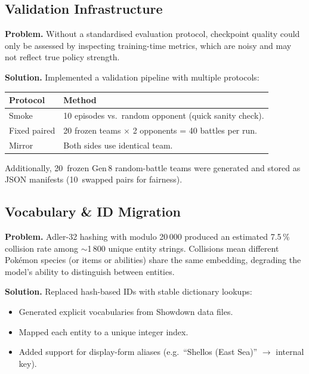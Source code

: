\subsection{Validation Infrastructure}

\textbf{Problem.} Without a standardised evaluation protocol, checkpoint
quality could only be assessed by inspecting training-time metrics, which are
noisy and may not reflect true policy strength.

\textbf{Solution.} Implemented a validation pipeline with multiple protocols:

\begin{center}
\small
\begin{tabularx}{\textwidth}{l X}
  \toprule
  \textbf{Protocol} & \textbf{Method} \\
  \midrule
  Smoke        & 10 episodes vs.\ random opponent (quick sanity check). \\
  Fixed paired & 20 frozen teams $\times$ 2 opponents = 40 battles per run. \\
  Mirror       & Both sides use identical team. \\
  \bottomrule
\end{tabularx}
\end{center}

Additionally, 20~frozen Gen\,8 random-battle teams were generated and stored
as JSON manifests (10~swapped pairs for fairness).

\subsection{Vocabulary \& ID Migration}

\textbf{Problem.} Adler-32 hashing with modulo 20\,000 produced an estimated
7.5\,\% collision rate among $\sim$1\,800 unique entity strings.  Collisions
mean different Pok\'{e}mon species (or items or abilities) share the same
embedding, degrading the model's ability to distinguish between entities.

\textbf{Solution.} Replaced hash-based IDs with stable dictionary lookups:

\begin{itemize}
  \item Generated explicit vocabularies from Showdown data files.
  \item Mapped each entity to a unique integer index.
  \item Added support for display-form aliases (e.g.\ ``Shellos (East Sea)''
        $\to$ internal key).
\end{itemize}

